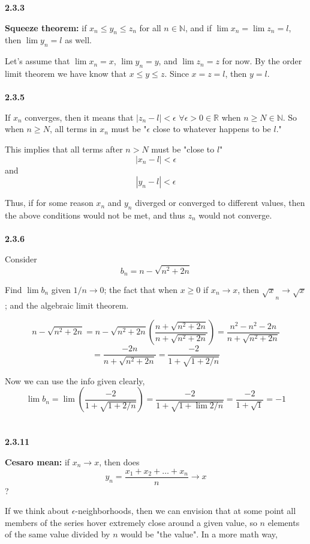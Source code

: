 \textbf{2.3.3}

\textbf{Squeeze theorem:} if $x_n \leq y_n \leq z_n$ for all $n\in\mathbb{N}$, and if
$\lim x_n = \lim z_n = l$, then $\lim y_n = l$ as well.

Let's assume that $\lim x_n = x$, $\lim y_n = y$, and $\lim z_n = z$ for now.
By the order limit theorem we have know that $x \leq y \leq z$.
Since $x = z = l$, then $y=l$.
\\~\\


\textbf{2.3.5}

If $x_n$ converges, then it means that $|z_n - l| < \epsilon$ $\forall \epsilon >0 \in \mathbb{R}$
when $n \geq N \in \mathbb{N}$.
So when $n \geq N$, all terms in $x_n$ must be "$\epsilon$ close to whatever happens to be $l$."

This implies that all terms after $n>N$ must be "close to $l$"
$$
| x_n - l | < \epsilon
$$
and
$$
| y_n - l | < \epsilon
$$

Thus, if for some reason $x_n$ and $y_n$ diverged or converged to different values, then the above conditions
would not be met, and thus $z_n$ would not converge.
\\~\\



\textbf{2.3.6}

Consider
$$
b_n = n - \sqrt{n^2 + 2n}
$$

Find $\lim b_n$ given $1/n \rightarrow 0$; the fact that when $x \geq 0$ if $x_n \rightarrow x$, then
$\sqrt x_n \rightarrow \sqrt x$; and the algebraic limit theorem.

$$
n - \sqrt{n^2 + 2n}
= n - \sqrt{n^2 +2n} \left( \frac{n + \sqrt{n^2 + 2n}}{n + \sqrt{n^2 + 2n}} \right) 
= \frac{n^2 - n^2 - 2n }{n + \sqrt{n^2 + 2n}}
$$
$$
= \frac{-2n}{n + \sqrt{n^2 + 2n}} 
= \frac{-2}{1 + \sqrt{1 + 2/n}}
$$

Now we can use the info given clearly,
$$
\lim b_n = \lim \left( \frac{-2}{1 + \sqrt{1 + 2/n}} \right)
= \frac{-2}{1 + \sqrt{1 + \lim{2/n} }}
= \frac{-2}{1+ \sqrt{1}}
= -1
$$
\\~\\


\textbf{2.3.11}

\textbf{Cesaro mean:} if $x_n \rightarrow x$, then does
$$
y_n = \frac{x_1 + x_2 + \ldots + x_n}{n} \rightarrow x
$$
?

If we think about $\epsilon$-neighborhoods, then we can envision that at some point all members of the
series hover extremely close around a given value, so $n$ elements of the same value divided by $n$
would be "the value".
In a more math way,

